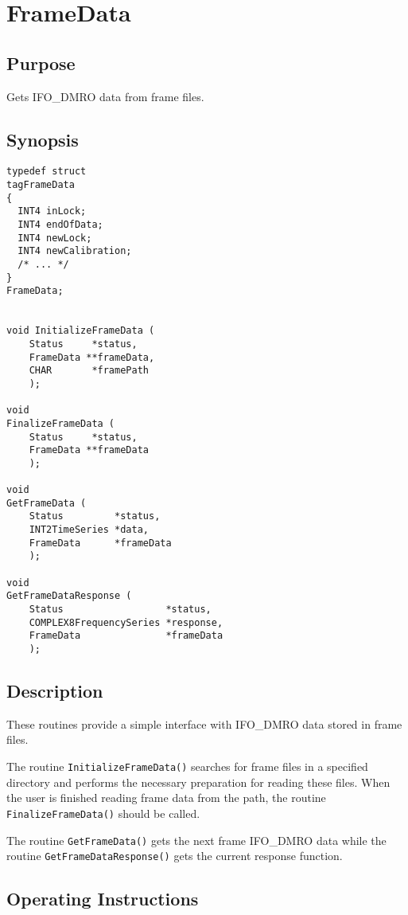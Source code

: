 \documentclass{article}
\begin{document}
\section{FrameData}

\subsection{Purpose}

Gets IFO\_DMRO data from frame files.

\subsection{Synopsis}

\begin{verbatim}
typedef struct
tagFrameData
{
  INT4 inLock;
  INT4 endOfData;
  INT4 newLock;
  INT4 newCalibration;
  /* ... */
}
FrameData;


void InitializeFrameData (
    Status     *status,
    FrameData **frameData,
    CHAR       *framePath
    );

void
FinalizeFrameData (
    Status     *status,
    FrameData **frameData
    );

void
GetFrameData (
    Status         *status,
    INT2TimeSeries *data,
    FrameData      *frameData
    );

void
GetFrameDataResponse (
    Status                  *status,
    COMPLEX8FrequencySeries *response,
    FrameData               *frameData
    );
\end{verbatim}

\subsection{Description}

These routines provide a simple interface with IFO\_DMRO data stored in frame
files.

The routine \texttt{InitializeFrameData()} searches for frame files in a
specified directory and performs the necessary preparation for reading these
files.  When the user is finished reading frame data from the path, the
routine \texttt{FinalizeFrameData()} should be called.

The routine \texttt{GetFrameData()} gets the next frame IFO\_DMRO data while
the routine \texttt{GetFrameDataResponse()} gets the current response
function.

\subsection{Operating Instructions}
\end{document}
